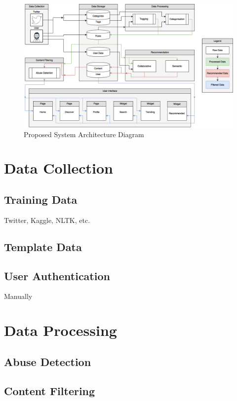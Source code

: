\begin{figure}[H]
  \centering
  \includegraphics[width=1.0\textwidth]{Images/Design/SystemArchitecture}
  \caption{Proposed System Architecture Diagram} \label{fig:SystemArchitecture} 
\end{figure}

\section{Data Collection}

\subsection{Training Data}
Twitter, Kaggle, NLTK, etc.

\subsection{Template Data}


\subsection{User Authentication}
Manually

\section{Data Processing}
\subsection{Abuse Detection}
\subsection{Content Filtering}
